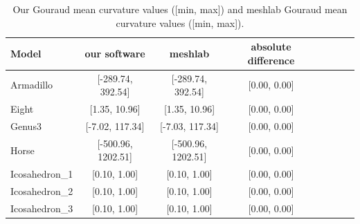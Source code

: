 \begin{table}[!h]%
    \centering
\begin{tabular}{l*{6}{c}r}
    \centering
    Model              & our software &  meshlab  & absolute difference\\
    \hline
    Armadillo          & [-289.74, 392.54] & [-289.74, 392.54] & [0.00, 0.00]\\
    Eight              & [1.35, 10.96] & [1.35, 10.96] & [0.00, 0.00]\\
    Genus3             & [-7.02, 117.34] & [-7.03, 117.34] & [0.00, 0.00] \\
    Horse              & [-500.96, 1202.51] &  [-500.96, 1202.51] & [0.00, 0.00]\\
    Icosahedron\_1      &  [0.10, 1.00] & [0.10, 1.00] & [0.00, 0.00]\\
    Icosahedron\_2      &  [0.10, 1.00] & [0.10, 1.00]& [0.00, 0.00] \\
    Icosahedron\_3      & [0.10, 1.00] &  [0.10, 1.00] & [0.00, 0.00]
\end{tabular}
\caption{Our Gouraud mean curvature values ([min, max]) and meshlab Gouraud mean curvature values ([min, max]).}
\label{table:table-mean-meshlab}
\end{table}


